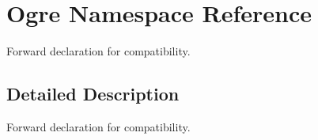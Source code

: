 \hypertarget{namespaceOgre}{
\section{Ogre Namespace Reference}
\label{d1/ddd/namespaceOgre}
}


Forward declaration for compatibility.  




\subsection{Detailed Description}
Forward declaration for compatibility. 